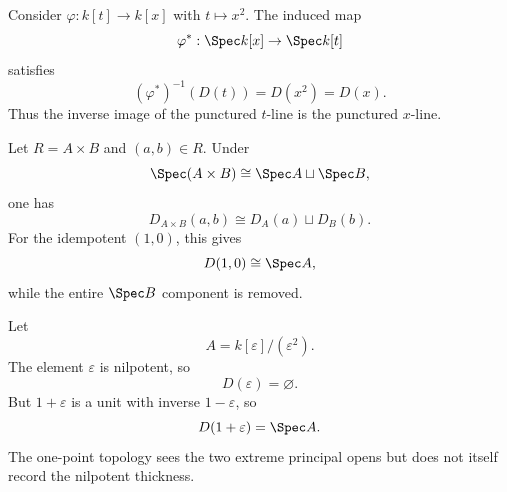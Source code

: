\begin{example}
Consider $\varphi:k[t]\to k[x]$ with $t\mapsto x^2$.  The induced map
\[
\varphi^\ast:\Spec k[x]\to\Spec k[t]
\]
satisfies
\[
(\varphi^\ast)^{-1}(D(t))=D(x^2)=D(x).
\]
Thus the inverse image of the punctured $t$-line is the punctured $x$-line.
\end{example}

\begin{example}
Let $R=A\times B$ and $(a,b)\in R$.  Under
\[
\Spec(A\times B)\cong\Spec A\sqcup\Spec B,
\]
one has
\[
D_{A\times B}(a,b)
\cong
D_A(a)\sqcup D_B(b).
\]
For the idempotent $(1,0)$, this gives
\[
D(1,0)\cong\Spec A,
\]
while the entire $\Spec B$ component is removed.
\end{example}

\begin{example}
Let
\[
A=k[\varepsilon]/(\varepsilon^2).
\]
The element $\varepsilon$ is nilpotent, so
\[
D(\varepsilon)=\varnothing.
\]
But $1+\varepsilon$ is a unit with inverse $1-\varepsilon$, so
\[
D(1+\varepsilon)=\Spec A.
\]
The one-point topology sees the two extreme principal opens but does not itself record the
nilpotent thickness.
\end{example}

